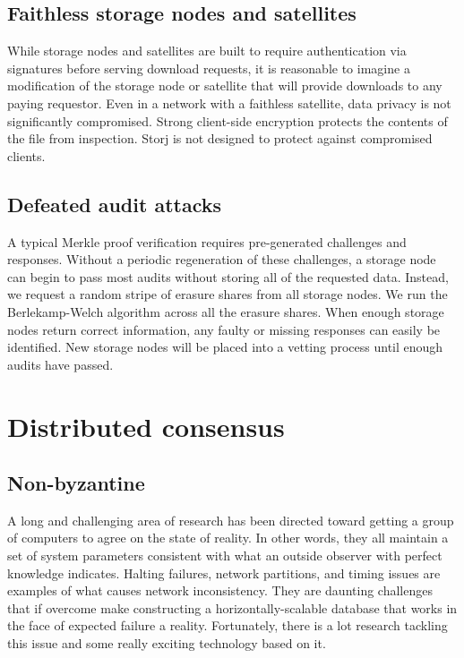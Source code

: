 \documentclass[11pt,fleqn,openany]{book}
\begin{document}
\section{Faithless storage nodes and satellites}

While storage nodes and satellites are built to require authentication via
signatures before serving download requests, it is reasonable to imagine a
modification of the storage node or satellite that will provide downloads to
any paying requestor.
Even in a network with a faithless satellite, data privacy is not significantly
compromised.
Strong client-side encryption protects the contents of the file from
inspection.
Storj is not designed to protect against compromised clients.

\section{Defeated audit attacks}

A typical Merkle proof verification requires pre-generated challenges and
responses.
Without a periodic regeneration of these challenges, a storage node can begin
to pass most audits without storing all of the requested data.
Instead, we request a random stripe of erasure shares from all storage nodes.
We run the Berlekamp-Welch algorithm\cite{bw} across all the
erasure shares.
When enough storage nodes return correct information, any faulty or missing
responses can easily be identified.
New storage nodes will be placed into a vetting process until enough audits
have passed.

\chapter{Distributed consensus}\label{chap:dist-consensus}

\section{Non-byzantine}

    A long and challenging area of research has been directed toward getting a
group of computers to agree on the state of reality. In other words, they all
maintain a set of system parameters consistent with what an outside observer with perfect knowledge indicates. Halting failures, network partitions, and timing issues \cite{google-distributed-system-design} are examples of what causes network inconsistency. They are daunting challenges that if overcome make constructing a horizontally-scalable database that works in the face of expected failure a reality. Fortunately, there is a lot research tackling this issue and some really exciting technology based on it.
\end{document}
